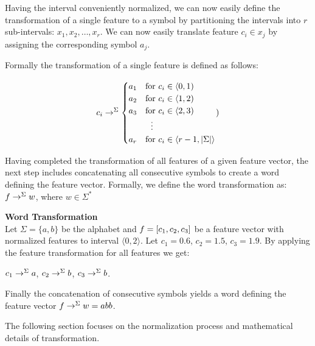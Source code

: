 \documentclass{mini}
\begin{document}
Having the interval conveniently normalized, we can now easily define the transformation of a single feature to a symbol by partitioning the intervals into $r$ sub-intervals: $x_1, x_2,\ldots,x_r$. We can now easily translate feature $c_i \in x_{j}$ by assigning the corresponding symbol $a_{j}$.

Formally the transformation of a single feature is defined as follows:

\begin{equation*}
c_i \featureTransformationSymbol{\Sigma}
\begin{cases}
a_1 & \text{for } c_{i} \in  \langle 0 , 1) \\
a_2 & \text{for } c_{i} \in  \langle 1 , 2) \\
a_3 & \text{for } c_{i} \in  \langle 2 , 3) \\
&\makebox[\widthof{${}\rightarrow{}$}][c]{\vdots} \\
a_{r} & \text{for } c_{i} \in \langle r -1, |\Sigma|  \rangle
\end{cases})
\end{equation*}

Having completed the transformation of all features of a given feature vector, the next step includes concatenating all consecutive symbols to create a word defining the feature vector. Formally, we define the word transformation as: $f \rightarrow^{\Sigma} w$, where $w \in \Sigma^*$ 

        
\begin{example} {\bf Word Transformation}\\
    Let $\Sigma =\{a,b\}$ be the alphabet and $f = [c_{1},c_{2},c_{3}]$ be a feature vector with normalized features to interval $\langle 0,2 \rangle$.
    Let $c_{1}=0.6$, $c_{2} = 1.5$, $c_{3} = 1.9$.
    By applying the feature transformation for all features we get:
    \begin{center}
        $c_{1} \rightarrow^{\Sigma} a$,
        $c_{2} \rightarrow^{\Sigma} b$,
        $c_{3} \rightarrow^{\Sigma} b$.
    \end{center}
    Finally the concatenation of consecutive symbols yields a word defining the feature vector $f \rightarrow^{\Sigma} w = abb$.
\end{example}

The following section focuses on the normalization process and mathematical details of transformation.
\end{document}
